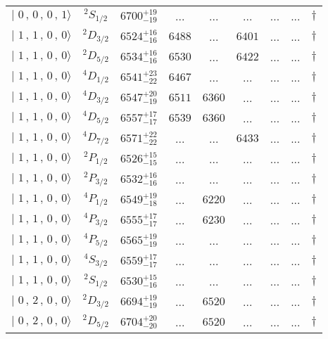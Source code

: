 \begin{tabular}{c c| c c c c c c c}
$\vert \,\,0\,,\,0\,,\,0\,,\,1 \rangle $ & $^{2}S_{1/2}$ & $6700^{+19}_{-19}$ & ... & ... & ... & ... & ... & $\dagger$ \\ 
$\vert \,\,1\,,\,1\,,\,0\,,\,0 \rangle $ & $^{2}D_{3/2}$ & $6524^{+16}_{-16}$ & $6488$ & ... & $6401$ & ... & ... & $\dagger$ \\ 
$\vert \,\,1\,,\,1\,,\,0\,,\,0 \rangle $ & $^{2}D_{5/2}$ & $6534^{+16}_{-16}$ & $6530$ & ... & $6422$ & ... & ... & $\dagger$ \\ 
$\vert \,\,1\,,\,1\,,\,0\,,\,0 \rangle $ & $^{4}D_{1/2}$ & $6541^{+23}_{-22}$ & $6467$ & ... & ... & ... & ... & $\dagger$ \\ 
$\vert \,\,1\,,\,1\,,\,0\,,\,0 \rangle $ & $^{4}D_{3/2}$ & $6547^{+20}_{-19}$ & $6511$ & $6360$ & ... & ... & ... & $\dagger$ \\ 
$\vert \,\,1\,,\,1\,,\,0\,,\,0 \rangle $ & $^{4}D_{5/2}$ & $6557^{+17}_{-17}$ & $6539$ & $6360$ & ... & ... & ... & $\dagger$ \\ 
$\vert \,\,1\,,\,1\,,\,0\,,\,0 \rangle $ & $^{4}D_{7/2}$ & $6571^{+22}_{-22}$ & ... & ... & $6433$ & ... & ... & $\dagger$ \\ 
$\vert \,\,1\,,\,1\,,\,0\,,\,0 \rangle $ & $^{2}P_{1/2}$ & $6526^{+15}_{-15}$ & ... & ... & ... & ... & ... & $\dagger$ \\ 
$\vert \,\,1\,,\,1\,,\,0\,,\,0 \rangle $ & $^{2}P_{3/2}$ & $6532^{+16}_{-16}$ & ... & ... & ... & ... & ... & $\dagger$ \\ 
$\vert \,\,1\,,\,1\,,\,0\,,\,0 \rangle $ & $^{4}P_{1/2}$ & $6549^{+19}_{-18}$ & ... & $6220$ & ... & ... & ... & $\dagger$ \\ 
$\vert \,\,1\,,\,1\,,\,0\,,\,0 \rangle $ & $^{4}P_{3/2}$ & $6555^{+17}_{-17}$ & ... & $6230$ & ... & ... & ... & $\dagger$ \\ 
$\vert \,\,1\,,\,1\,,\,0\,,\,0 \rangle $ & $^{4}P_{5/2}$ & $6565^{+19}_{-19}$ & ... & ... & ... & ... & ... & $\dagger$ \\ 
$\vert \,\,1\,,\,1\,,\,0\,,\,0 \rangle $ & $^{4}S_{3/2}$ & $6559^{+17}_{-17}$ & ... & ... & ... & ... & ... & $\dagger$ \\ 
$\vert \,\,1\,,\,1\,,\,0\,,\,0 \rangle $ & $^{2}S_{1/2}$ & $6530^{+15}_{-16}$ & ... & ... & ... & ... & ... & $\dagger$ \\ 
$\vert \,\,0\,,\,2\,,\,0\,,\,0 \rangle $ & $^{2}D_{3/2}$ & $6694^{+19}_{-19}$ & ... & $6520$ & ... & ... & ... & $\dagger$ \\ 
$\vert \,\,0\,,\,2\,,\,0\,,\,0 \rangle $ & $^{2}D_{5/2}$ & $6704^{+20}_{-20}$ & ... & $6520$ & ... & ... & ... & $\dagger$ \\ 
\hline \hline
\end{tabular}
